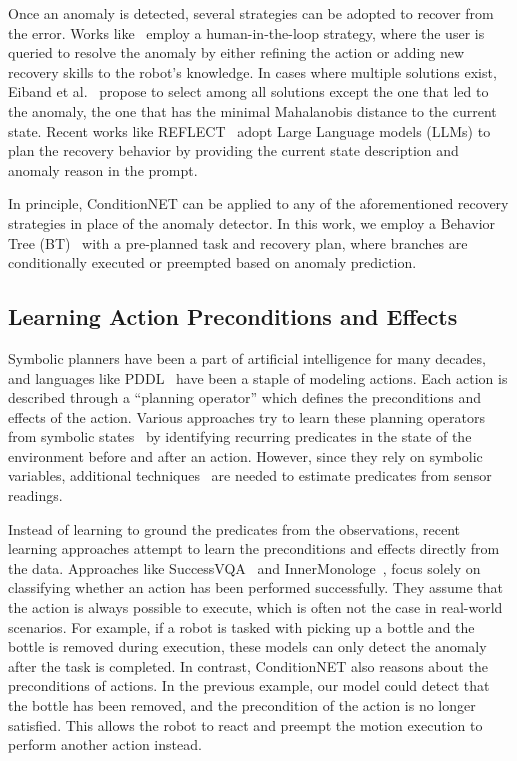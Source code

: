 Once an anomaly is detected, several strategies can be adopted to recover from the error. Works like~\cite{ANOMALY1} employ a human-in-the-loop strategy, where the user is queried to resolve the anomaly by either refining the action or adding new recovery skills to the robot's knowledge. In cases where multiple solutions exist, Eiband et al.~\cite{Eiband2019} propose to select among all solutions except the one that led to the anomaly, the one that has the minimal Mahalanobis distance to the current state. Recent works like REFLECT~\cite{liu2023reflect} adopt Large Language models (LLMs) to plan the recovery behavior by providing the current state description and anomaly reason in the prompt.

In principle, ConditionNET can be applied to any of the aforementioned recovery strategies in place of the anomaly detector. In this work, we employ a Behavior Tree (BT)~\cite{BT} with a pre-planned task and recovery plan, where branches are conditionally executed or preempted based on anomaly prediction. 

\subsection{Learning Action Preconditions and Effects}
Symbolic planners have been a part of artificial intelligence for many decades, and languages like PDDL~\cite{PDDL} have been a staple of modeling actions. Each action is described through a ``planning operator'' which defines the preconditions and effects of the action. Various approaches try to learn these planning operators from symbolic states~\cite{CLASSICAL4, CLASSICAL5} by identifying recurring predicates in the state of the environment before and after an action. However, since they rely on symbolic variables, additional techniques~\cite{CONT2} are needed to estimate predicates from sensor readings.

Instead of learning to ground the predicates from the observations, recent learning approaches attempt to learn the preconditions and effects directly from the data. Approaches like SuccessVQA~\cite{SuccessVQA} and InnerMonologe~\cite{InnerMonologe}, focus solely on classifying whether an action has been performed successfully. They assume that the action is always possible to execute, which is often not the case in real-world scenarios. For example, if a robot is tasked with picking up a bottle and the bottle is removed during execution, these models can only detect the anomaly after the task is completed. In contrast, ConditionNET also reasons about the preconditions of actions. In the previous example, our model could detect that the bottle has been removed, and the precondition of the action is no longer satisfied. This allows the robot to react and preempt the motion execution to perform another action instead.

